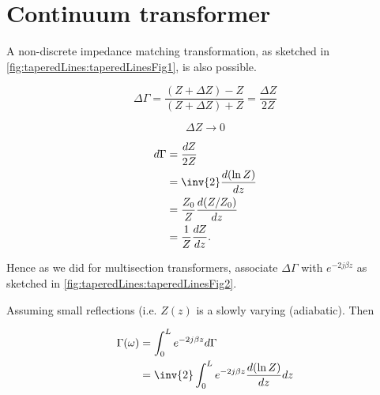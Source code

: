 %
%
\section{Continuum transformer}
A non-discrete impedance matching transformation, as sketched in \cref{fig:taperedLines:taperedLinesFig1}, is also possible.


\begin{equation}\label{eqn:continuumAndOtherTransformersCore:820}
\Delta \Gamma
= \frac{ (Z + \Delta Z) - Z }{(Z + \Delta Z) + Z}
= \frac{\Delta Z}{2 Z}
\end{equation}

\begin{equation}\label{eqn:continuumAndOtherTransformersCore:840}
\Delta Z \rightarrow 0
\end{equation}

\begin{equation}\label{eqn:continuumAndOtherTransformersCore:860}
\begin{aligned}
d\Gamma
&= \frac{dZ}{2 Z}
\\ &= \inv{2} \frac{d (\ln Z)}{dz}
\\ &= \frac{Z_0}{Z} \frac{d (Z/Z_0)}{dz}
\\ &= \frac{1}{Z} \frac{d Z}{dz}.
\end{aligned}
\end{equation}

Hence as we did for multisection transformers, associate \( \Delta \Gamma \) with \( e^{- 2j \beta z} \) as sketched in \cref{fig:taperedLines:taperedLinesFig2}.


Assuming small reflections (i.e. \( Z(z) \) is a slowly varying (adiabatic).  Then

\begin{equation}\label{eqn:continuumAndOtherTransformersCore:920}
\begin{aligned}
\Gamma(\omega)
&= \int_0^L e^{ -2 j \beta z} d\Gamma
\\ &= \inv{2}
\int_0^L e^{ -2 j \beta z}  \frac{d (\ln Z)}{dz} dz
\end{aligned}
\end{equation}

